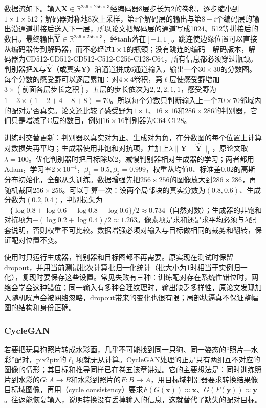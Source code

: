 数据流如下。输入$\bm{X}\in\mathbb{R}^{256\times256\times3}$经编码器8层步长为2的卷积，逐步缩小到$1\times1\times512$；解码器对称地8次上采样，第$i$个解码层的输出与第$8-i$个编码层的输出沿通道拼接后送入下一层，所以论文把解码层的通道写成1024、512等拼接后的数目。最终输出$\widehat{\bm{Y}}\in\mathbb{R}^{256\times256\times3}$，经tanh落在$[-1,1]$。跳连使边缘位置可以直接从编码器传到解码器，而不必经过$1\times1$的瓶颈；没有跳连的编码—解码版本，解码器为CD512-CD512-CD512-C512-C256-C128-C64，所有信息都必须穿过瓶颈。判别器把$\bm{X}$与$\widehat{\bm{Y}}$（或真实$\bm{Y}$）沿通道拼成6通道输入，输出一个$30\times30$的分数图。每个分数的感受野可以逐层累加：对$4\times4$卷积，第$\ell$层使感受野增加$3\times(\text{前面各层步长之积})$，五层的步长依次为$2,2,2,1,1$，感受野为$1+3\times(1+2+4+8+8)=70$。所以每个分数只判断输入上一个$70\times70$邻域内的配对是否真实。论文还比较了感受野为$1\times1$、$16\times16$和$286\times286$的判别器，它们只是增减了C层的数目，例如$16\times16$判别器为C64-C128。

训练时交替更新：判别器以真实对为正、生成对为负，在分数图的每个位置上计算对数损失再平均；生成器使用非饱和对抗项，并加上$\lambda\lVert\bm{Y}-\widehat{\bm{Y}}\rVert_1$，原论文取$\lambda=100$。优化判别器时把目标除以2，减慢判别器相对生成器的学习；两者都用Adam，学习率$2\times10^{-4}$，$\beta_1=0.5,\beta_2=0.999$，权重从均值0、标准差0.02的高斯分布初始化，全部从头训练。数据增强先把$256\times256$的图像放大到$286\times286$，再随机裁回$256\times256$。可以手算一次：设两个局部块的真实分数为$(0.8,0.6)$、生成分数为$(0.2,0.4)$，判别损失为$-\{\log0.8+\log0.6+\log0.8+\log0.6\}/2\approx0.734$（自然对数）；生成器的非饱和对抗项为$-(\log0.2+\log0.4)/2\approx1.263$。像素项是求和还是求平均必须与$\lambda$配套说明，否则权重不可比较。数据增强必须对输入与目标做相同的裁剪和翻转，保证配对位置不变。

使用时只运行生成器，判别器和目标图都不再需要。原实现在测试时保留dropout，并用当前测试批次计算批归一化统计（批大小为1时相当于实例归一化），复现时要保存这些设置。常见失败有三种：训练配对存在系统性错位时，网络会学会这种错位；同一输入有多种合理纹理时，输出缺乏多样性，原论文发现加入随机噪声会被网络忽略，dropout带来的变化也很有限；局部块逼真不保证整幅图的结构和身份正确。

\subsubsection{CycleGAN}
\label{sec:vision-generation-cyclegan}

若要把玩具狗照片转成水彩画，几乎不可能找到同一只狗、同一姿态的“照片—水彩”配对，pix2pix的$\ell_1$项就无从计算。CycleGAN处理的正是只有两组互不对应的图像的情形；其目标和推导同样已在卷五该章讲过。它的主要想法是：同时训练照片到水彩的$G:A\to B$和水彩到照片的$F:B\to A$，用目标域判别器要求转换结果像目标域图像，再用（cycle consistency）要求$F(G(\bm{x}))\approx\bm{x}$、$G(F(\bm{y}))\approx\bm{y}$。往返能恢复输入，说明转换没有丢掉输入的信息，这就替代了缺失的配对目标。

